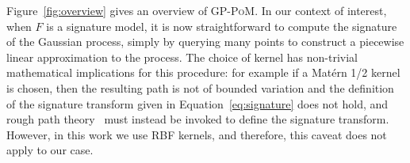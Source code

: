 \documentclass{article}
\newcommand{\reals}{\mathbb{R}}
\newcommand{\dataspace}{\mathcal{X}}
\newcommand{\lspace}{\mathcal{Y}}
\newcommand{\seriesspace}{\mathcal{S}}
\begin{document}
%
Figure~\ref{fig:overview} gives an overview of \textsc{GP-PoM}. 
%
In our context of interest, when $F$ is a signature model, it is now
straightforward to compute the signature of the Gaussian process, simply
by querying many points to construct a piecewise linear approximation to
the process.  The choice of kernel has non-trivial mathematical
implications for this procedure: for example if a Mat{\'e}rn 1/2 kernel
is chosen, then the resulting path is not of bounded variation and the
definition of the signature transform given in Equation~\eqref{eq:signature}
does not hold, and rough path theory~\citep{lyons1998differential} must instead be invoked to define the
signature transform. However, in this work we use RBF kernels, and therefore, this caveat does not apply to our case.



\end{document}
